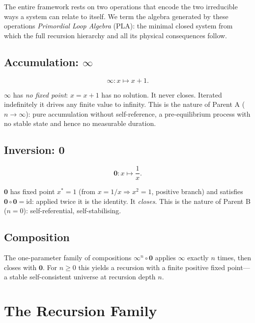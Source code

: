 \documentclass[prd,twocolumn,preprintnumbers,amsmath,amssymb]{revtex4-2}
\newcommand{\acc}{\mathbf{\infty}}
\newcommand{\inv}{\mathbf{0}}
\begin{document}
The entire framework rests on two operations that encode the two
irreducible ways a system can relate to itself.  We term the algebra
generated by these operations \emph{Primordial Loop Algebra} (PLA):
the minimal closed system from which the full recursion hierarchy
and all its physical consequences follow.

\subsection{Accumulation: $\acc$}

\begin{equation}
  \acc : x \mapsto x + 1.
  \label{eq:acc}
\end{equation}

$\acc$ has \emph{no fixed point}: $x = x+1$ has no solution.  It
never closes.  Iterated indefinitely it drives any finite value to
infinity.  This is the nature of Parent A ($n\to\infty$): pure
accumulation without self-reference, a pre-equilibrium process with
no stable state and hence no measurable duration.

\subsection{Inversion: $\inv$}

\begin{equation}
  \inv : x \mapsto \frac{1}{x}.
  \label{eq:inv}
\end{equation}

$\inv$ has fixed point $x^*=1$ (from $x = 1/x \Rightarrow x^2=1$,
positive branch) and satisfies $\inv \circ \inv = \mathrm{id}$:
applied twice it is the identity.  It \emph{closes}.  This is the
nature of Parent B ($n=0$): self-referential, self-stabilising.

\subsection{Composition}

The one-parameter family of compositions $\acc^n \circ \inv$ applies
$\acc$ exactly $n$ times, then closes with $\inv$.  For
$n \geq 0$ this yields a recursion with a finite positive fixed
point---a stable self-consistent universe at recursion depth $n$.

\section{The Recursion Family}
\label{sec:family}
\end{document}

